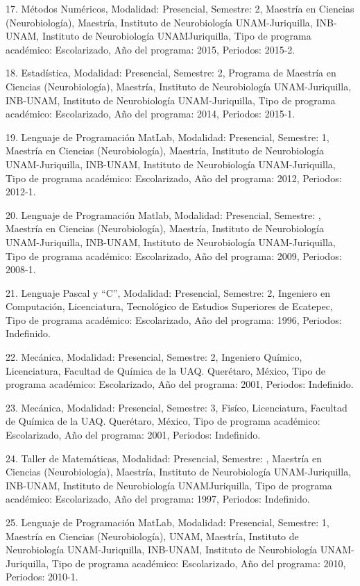 \documentclass[12pt]{article}
\begin{document}
17. Métodos Numéricos, Modalidad: Presencial, Semestre: 2, Maestría en Ciencias (Neurobiología), Maestría, Instituto de Neurobiología 
UNAM-Juriquilla, INB-UNAM, Instituto de Neurobiología UNAMJuriquilla, Tipo de programa académico: Escolarizado, Año del programa: 2015, 
Periodos: 2015-2.

18. Estadística, Modalidad: Presencial, Semestre: 2, Programa de Maestría en Ciencias (Neurobiología), Maestría, Instituto de 
Neurobiología UNAM-Juriquilla, INB-UNAM, Instituto de Neurobiología UNAM-Juriquilla, Tipo de programa académico: Escolarizado, Año del 
programa: 2014, Periodos: 2015-1.

19. Lenguaje de Programación MatLab, Modalidad: Presencial, Semestre: 1, Maestría en Ciencias (Neurobiología), Maestría, Instituto de 
Neurobiología UNAM-Juriquilla, INB-UNAM, Instituto de Neurobiología UNAM-Juriquilla, Tipo de programa académico: Escolarizado, Año del 
programa: 2012, Periodos: 2012-1.

20. Lenguaje de Programación Matlab, Modalidad: Presencial, Semestre: , Maestría en Ciencias (Neurobiología), Maestría, Instituto de 
Neurobiología UNAM-Juriquilla, INB-UNAM, Instituto de Neurobiología UNAM-Juriquilla, Tipo de programa académico: Escolarizado, Año del 
programa: 2009, Periodos: 2008-1.

21. Lenguaje Pascal y “C”, Modalidad: Presencial, Semestre: 2, Ingeniero en Computación, Licenciatura, Tecnológico de Estudios 
Superiores de Ecatepec, Tipo de programa académico: Escolarizado, Año del programa: 1996, Periodos: Indefinido.

22. Mecánica, Modalidad: Presencial, Semestre: 2, Ingeniero Químico, Licenciatura, Facultad de Química de la UAQ. Querétaro, México, 
Tipo de programa académico: Escolarizado, Año del programa: 2001, Periodos: Indefinido.

23. Mecánica, Modalidad: Presencial, Semestre: 3, Fisíco, Licenciatura, Facultad de Química de la UAQ. Querétaro, México, Tipo de 
programa académico: Escolarizado, Año del programa: 2001, Periodos: Indefinido.

24. Taller de Matemáticas, Modalidad: Presencial, Semestre: , Maestría en Ciencias (Neurobiología), Maestría, Instituto de 
Neurobiología UNAM-Juriquilla, INB-UNAM, Instituto de Neurobiología UNAMJuriquilla, Tipo de programa académico: Escolarizado, Año del 
programa: 1997, Periodos: Indefinido.

25. Lenguaje de Programación MatLab, Modalidad: Presencial, Semestre: 1, Maestría en Ciencias (Neurobiología), UNAM, Maestría, 
Instituto de Neurobiología UNAM-Juriquilla, INB-UNAM, Instituto de Neurobiología UNAM-Juriquilla, Tipo de programa académico: 
Escolarizado, Año del programa: 2010, Periodos: 2010-1.
\end{document}
